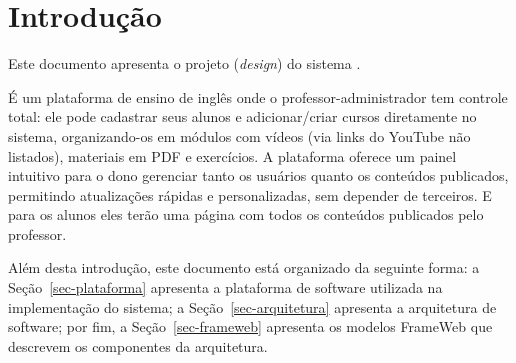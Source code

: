 \chapter{Introdução}
\label{sec-intro}
\vspace{-1cm}

Este documento apresenta o projeto (\textit{design}) do sistema \emph{\imprimirtitulo}. 

É um plataforma de ensino de inglês onde o professor-administrador tem controle total: ele pode cadastrar seus alunos e adicionar/criar cursos diretamente no sistema, organizando-os em módulos com vídeos (via links do YouTube não listados), materiais em PDF e exercícios. A plataforma oferece um painel intuitivo para o dono gerenciar tanto os usuários quanto os conteúdos publicados, permitindo atualizações rápidas e personalizadas, sem depender de terceiros. E para os alunos eles terão uma página com todos os conteúdos publicados pelo professor.


Além desta introdução, este documento está organizado da seguinte forma: 
a Seção~\ref{sec-plataforma} apresenta a plataforma de software utilizada na implementação do sistema;
a Seção~\ref{sec-arquitetura} apresenta a arquitetura de software; por fim, 
a Seção~\ref{sec-frameweb} apresenta os modelos FrameWeb que descrevem os componentes da arquitetura.

